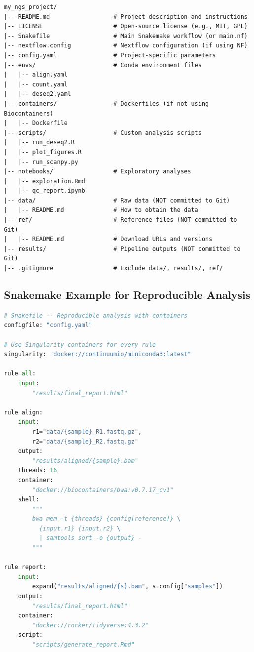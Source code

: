 \begin{lstlisting}[caption={Recommended directory structure for a reproducible bioinformatics project.},label=lst:project-structure]
my_ngs_project/
|-- README.md                  # Project description and instructions
|-- LICENSE                    # Open-source license (e.g., MIT, GPL)
|-- Snakefile                  # Main Snakemake workflow (or main.nf)
|-- nextflow.config            # Nextflow configuration (if using NF)
|-- config.yaml                # Project-specific parameters
|-- envs/                      # Conda environment files
|   |-- align.yaml
|   |-- count.yaml
|   |-- deseq2.yaml
|-- containers/                # Dockerfiles (if not using Biocontainers)
|   |-- Dockerfile
|-- scripts/                   # Custom analysis scripts
|   |-- run_deseq2.R
|   |-- plot_figures.R
|   |-- run_scanpy.py
|-- notebooks/                 # Exploratory analyses
|   |-- exploration.Rmd
|   |-- qc_report.ipynb
|-- data/                      # Raw data (NOT committed to Git)
|   |-- README.md              # How to obtain the data
|-- ref/                       # Reference files (NOT committed to Git)
|   |-- README.md              # Download URLs and versions
|-- results/                   # Pipeline outputs (NOT committed to Git)
|-- .gitignore                 # Exclude data/, results/, ref/
\end{lstlisting}

\subsection{Snakemake Example for Reproducible Analysis}

\begin{lstlisting}[language=Python,caption={Snakemake workflow for a reproducible project with containers.},label=lst:smk-repro]
# Snakefile -- Reproducible analysis with containers
configfile: "config.yaml"

# Use Singularity containers for every rule
singularity: "docker://continuumio/miniconda3:latest"

rule all:
    input:
        "results/final_report.html"

rule align:
    input:
        r1="data/{sample}_R1.fastq.gz",
        r2="data/{sample}_R2.fastq.gz"
    output:
        "results/aligned/{sample}.bam"
    threads: 16
    container:
        "docker://biocontainers/bwa:v0.7.17_cv1"
    shell:
        """
        bwa mem -t {threads} {config[reference]} \
          {input.r1} {input.r2} \
          | samtools sort -o {output} -
        """

rule report:
    input:
        expand("results/aligned/{s}.bam", s=config["samples"])
    output:
        "results/final_report.html"
    container:
        "docker://rocker/tidyverse:4.3.2"
    script:
        "scripts/generate_report.Rmd"
\end{lstlisting}

